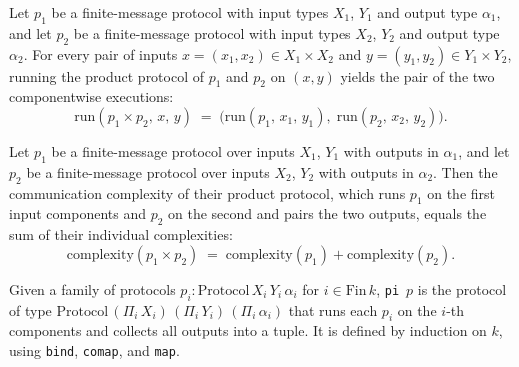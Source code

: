\begin{theorem}
\label{CommunicationComplexity.Deterministic.FiniteMessage.Protocol.prod_run}
\leanok
{}
Let $p_1$ be a finite-message protocol with input types $X_1$, $Y_1$ and output type
$\alpha_1$, and let $p_2$ be a finite-message protocol with input types $X_2$, $Y_2$ and
output type $\alpha_2$. For every pair of inputs $x = (x_1, x_2) \in X_1 \times X_2$ and
$y = (y_1, y_2) \in Y_1 \times Y_2$, running the product protocol of $p_1$ and $p_2$ on
$(x, y)$ yields the pair of the two componentwise executions:
\[
\mathrm{run}(p_1 \times p_2,\, x,\, y) \;=\; \bigl(\mathrm{run}(p_1,\, x_1,\, y_1),\;
\mathrm{run}(p_2,\, x_2,\, y_2)\bigr).
\]
\end{theorem}

\begin{theorem}
\label{CommunicationComplexity.Deterministic.FiniteMessage.Protocol.prod_complexity}
\leanok
{}
Let $p_1$ be a finite-message protocol over inputs $X_1$, $Y_1$ with outputs in
$\alpha_1$, and let $p_2$ be a finite-message protocol over inputs $X_2$, $Y_2$ with
outputs in $\alpha_2$. Then the communication complexity of their product protocol,
which runs $p_1$ on the first input components and $p_2$ on the second and pairs the two
outputs, equals the sum of their individual complexities:
\[
\mathrm{complexity}(p_1 \times p_2) \;=\; \mathrm{complexity}(p_1) +
\mathrm{complexity}(p_2).
\]
\end{theorem}

\begin{definition}
\label{CommunicationComplexity.Deterministic.FiniteMessage.Protocol.pi}
\leanok
{}
Given a family of protocols $p_i : \mathrm{Protocol}\,X_i\,Y_i\,\alpha_i$ for
$i \in \mathrm{Fin}\,k$, \texttt{pi}~$p$ is the protocol of type
$\mathrm{Protocol}\,(\Pi_i\,X_i)\,(\Pi_i\,Y_i)\,(\Pi_i\,\alpha_i)$ that runs each $p_i$
on the $i$-th components and collects all outputs into a tuple.
It is defined by induction on $k$, using \texttt{bind}, \texttt{comap}, and \texttt{map}.
\end{definition}

